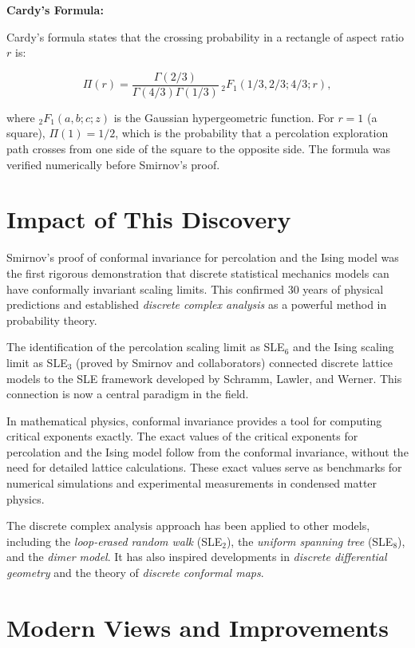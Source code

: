 \textbf{Cardy's Formula:}

Cardy's formula states that the crossing probability in a rectangle of aspect ratio $r$ is:

\[
\Pi(r) = \frac{\Gamma(2/3)}{\Gamma(4/3)\Gamma(1/3)} \, {}_2F_1(1/3, 2/3; 4/3; r),
\]

where ${}_2F_1(a,b;c;z)$ is the Gaussian hypergeometric function. For $r=1$ (a square), $\Pi(1) = 1/2$, which is the probability that a percolation exploration path crosses from one side of the square to the opposite side. The formula was verified numerically before Smirnov's proof.

\section{Impact of This Discovery}\label{ch2010stanislavsmirnov:impact-of-this-discovery}

Smirnov's proof of conformal invariance for percolation and the Ising model was the first rigorous demonstration that discrete statistical mechanics models can have conformally invariant scaling limits. This confirmed 30 years of physical predictions and established \emph{discrete complex analysis} as a powerful method in probability theory.

The identification of the percolation scaling limit as SLE$_6$ and the Ising scaling limit as SLE$_3$ (proved by Smirnov and collaborators) connected discrete lattice models to the SLE framework developed by Schramm, Lawler, and Werner. This connection is now a central paradigm in the field.

In mathematical physics, conformal invariance provides a tool for computing critical exponents exactly. The exact values of the critical exponents for percolation and the Ising model follow from the conformal invariance, without the need for detailed lattice calculations. These exact values serve as benchmarks for numerical simulations and experimental measurements in condensed matter physics.

The discrete complex analysis approach has been applied to other models, including the \emph{loop-erased random walk} (SLE$_2$), the \emph{uniform spanning tree} (SLE$_8$), and the \emph{dimer model}. It has also inspired developments in \emph{discrete differential geometry} and the theory of \emph{discrete conformal maps}.

\section{Modern Views and Improvements}\label{ch2010stanislavsmirnov:modern-views-and-improvements}

